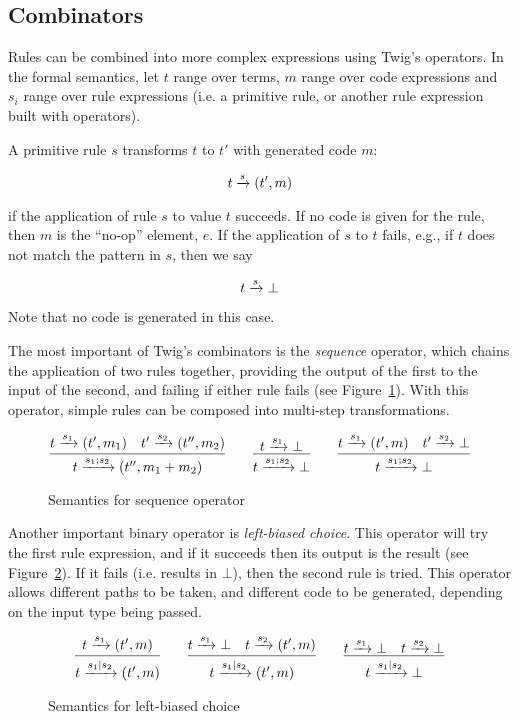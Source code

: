 \subsection{Combinators}

Rules can be combined into more complex expressions using Twig's operators. In
the formal semantics, let $t$ range over terms, $m$ range over code
expressions and $s_i$ range over rule expressions (i.e. a primitive rule, or
another rule expression built with operators).

A primitive rule $s$ transforms $t$ to $t'$ with generated code $m$:

\[
t \xrightarrow{s} (t',m)
\]

if the application of rule $s$ to value $t$ succeeds. If no code is given for
the rule, then $m$ is the ``no-op'' element, $e$. If the application of $s$ to
$t$ fails, e.g., if $t$ does not match the pattern in $s$, then we say

\[
t \xrightarrow{s} \bot
\]

Note that no code is generated in this case.

The most important of Twig's combinators is the \emph{sequence} operator,
which chains the application of two rules together, providing the output of
the first to the input of the second, and failing if either rule fails (see
Figure~\ref{fig:semantics-seq}). With this operator, simple rules can be
composed into multi-step transformations.

\begin{figure}[ht]
\label{fig:semantics-seq}
\[
\infer{t \arr{s_1;s_2} (t'',m_1+m_2)}{t \arr{s_1} (t',m_1) \quad t' \arr{s_2} 
(t'',m_2)}
\qquad 
\infer{t \arr{s_1;s_2} \bot}{t \arr{s_1} \bot}
\qquad
\infer{t \arr{s_1;s_2} \bot}{t \arr{s_1} (t',m) \quad t' \arr{s_2} \bot}
\]
\caption{Semantics for sequence operator}
\end{figure}

Another important binary operator is \emph{left-biased choice}. This operator
will try the first rule expression, and if it succeeds then its output is the
result (see Figure~\ref{semantics:choice}). If it fails (i.e. results in
$\bot$), then the second rule is tried. This operator allows different paths
to be taken, and different code to be generated, depending on the input type
being passed.

\begin{figure}[ht]
\label{semantics:choice}
\[
\infer{t \arr{s_1|s_2} (t',m)}{t \arr{s_1} (t',m)}
\qquad 
\infer{t \arr{s_1|s_2} (t',m)}{t \arr{s_1} \bot \quad t \arr{s_2} (t',m)}
\qquad
\infer{t \arr{s_1|s_2} \bot}{t \arr{s_1} \bot \quad t \arr{s_2} \bot}
\]
\caption{Semantics for left-biased choice}
\end{figure}

